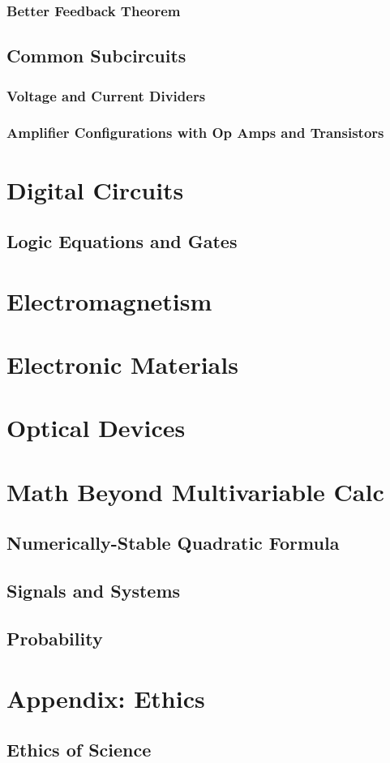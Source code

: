 \documentclass[12pt]{report}
\begin{document}
\subsection{Better Feedback Theorem}
\section{Common Subcircuits}
\subsection{Voltage and Current Dividers}
\subsection{Amplifier Configurations with Op Amps and Transistors}


\newpage
\chapter{Digital Circuits}
\section{Logic Equations and Gates}

\newpage
\chapter{Electromagnetism}

\newpage
\chapter{Electronic Materials}

\newpage
\chapter{Optical Devices}

\newpage
\chapter{Math Beyond Multivariable Calc}
\section{Numerically-Stable Quadratic Formula}
\section{Signals and Systems}
\section{Probability}

\newpage
\chapter{Appendix: Ethics}
\section{Ethics of Science}
\end{document}
